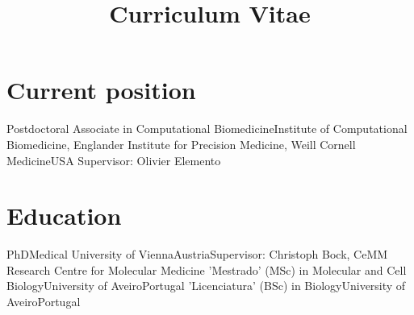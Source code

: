 \documentclass[11pt,a4paper,roman]{moderncv} %
\title{Curriculum Vitae}
\begin{document}
\makecvtitle %


\section{Current position}
    {Postdoctoral Associate in Computational Biomedicine}{Institute of Computational Biomedicine, Englander Institute for Precision Medicine, Weill Cornell Medicine}{USA}
    {}{Supervisor: Olivier Elemento}


\section{Education}
        {PhD}{Medical University of Vienna}{Austria}{}{Supervisor: Christoph Bock, CeMM Research Centre for Molecular Medicine}
        {'Mestrado' (MSc) in Molecular and Cell Biology}{University of Aveiro}{Portugal}{}{}
        {'Licenciatura' (BSc) in Biology}{University of Aveiro}{Portugal}{}{}


\end{document}
